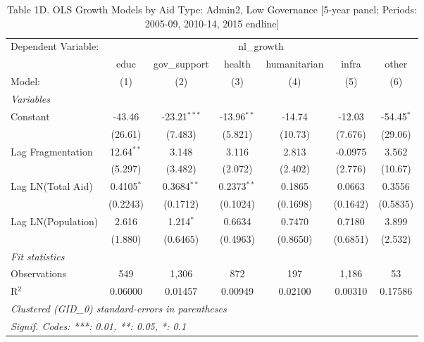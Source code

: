 
\begin{table}[H]
   \caption{Table 1D. OLS Growth Models by Aid Type: Admin2, Low Governance [5-year panel; Periods: 2005-09, 2010-14, 2015 endline]}
   \centering
   \begin{tabular}{lcccccc}
      \tabularnewline \midrule \midrule
      Dependent Variable: & \multicolumn{6}{c}{nl\_growth}\\
                         & educ         & gov\_support   & health        & humanitarian & infra    & other \\   
      Model:             & (1)          & (2)            & (3)           & (4)          & (5)      & (6)\\  
      \midrule
      \emph{Variables}\\
      Constant           & -43.46       & -23.21$^{***}$ & -13.96$^{**}$ & -14.74       & -12.03   & -54.45$^{*}$\\   
                         & (26.61)      & (7.483)        & (5.821)       & (10.73)      & (7.676)  & (29.06)\\   
      Lag Fragmentation  & 12.64$^{**}$ & 3.148          & 3.116         & 2.813        & -0.0975  & 3.562\\   
                         & (5.297)      & (3.482)        & (2.072)       & (2.402)      & (2.776)  & (10.67)\\   
      Lag LN(Total Aid)  & 0.4105$^{*}$ & 0.3684$^{**}$  & 0.2373$^{**}$ & 0.1865       & 0.0663   & 0.3556\\   
                         & (0.2243)     & (0.1712)       & (0.1024)      & (0.1698)     & (0.1642) & (0.5835)\\   
      Lag LN(Population) & 2.616        & 1.214$^{*}$    & 0.6634        & 0.7470       & 0.7180   & 3.899\\   
                         & (1.880)      & (0.6465)       & (0.4963)      & (0.8650)     & (0.6851) & (2.532)\\   
      \midrule
      \emph{Fit statistics}\\
      Observations       & 549          & 1,306          & 872           & 197          & 1,186    & 53\\  
      R$^2$              & 0.06000      & 0.01457        & 0.00949       & 0.02100      & 0.00310  & 0.17586\\  
      \midrule \midrule
      \multicolumn{7}{l}{\emph{Clustered (GID\_0) standard-errors in parentheses}}\\
      \multicolumn{7}{l}{\emph{Signif. Codes: ***: 0.01, **: 0.05, *: 0.1}}\\
   \end{tabular}
\end{table}



